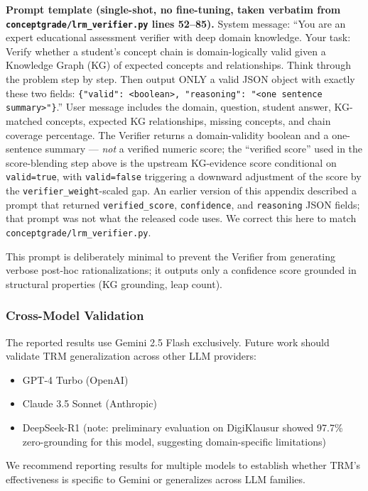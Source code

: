 \documentclass[journal,review]{vgtc}
\begin{document}
\textbf{Prompt template (single-shot, no fine-tuning, taken verbatim from
\texttt{conceptgrade/lrm\_verifier.py} lines 52--85).} System message:
``You are an expert educational assessment verifier with deep domain
knowledge. Your task: Verify whether a student's concept chain is
domain-logically valid given a Knowledge Graph (KG) of expected concepts
and relationships. Think through the problem step by step. Then output
ONLY a valid JSON object with exactly these two fields:
\texttt{\{"valid": <boolean>, "reasoning": "<one sentence summary>"\}}.''
User message includes the domain, question, student answer, KG-matched
concepts, expected KG relationships, missing concepts, and chain
coverage percentage. The Verifier returns a domain-validity boolean and
a one-sentence summary --- \emph{not} a verified numeric score; the
``verified score'' used in the score-blending step above is the
upstream KG-evidence score conditional on \texttt{valid=true}, with
\texttt{valid=false} triggering a downward adjustment of the score by
the \texttt{verifier\_weight}-scaled gap. An earlier version of this
appendix described a prompt that returned \texttt{verified\_score},
\texttt{confidence}, and \texttt{reasoning} JSON fields; that prompt was
not what the released code uses. We correct this here to match
\texttt{conceptgrade/lrm\_verifier.py}.

This prompt is deliberately minimal to prevent the Verifier from generating verbose post-hoc rationalizations; it outputs only a confidence score grounded in structural properties (KG grounding, leap count).

\subsubsection{Cross-Model Validation}

The reported results use Gemini 2.5 Flash exclusively. Future work should validate TRM generalization across other LLM providers:
\begin{itemize}
  \item GPT-4 Turbo (OpenAI)
  \item Claude 3.5 Sonnet (Anthropic)
  \item DeepSeek-R1 (note: preliminary evaluation on DigiKlausur showed 97.7\% zero-grounding for this model, suggesting domain-specific limitations)
\end{itemize}

We recommend reporting results for multiple models to establish whether TRM's effectiveness is specific to Gemini or generalizes across LLM families.
\end{document}
